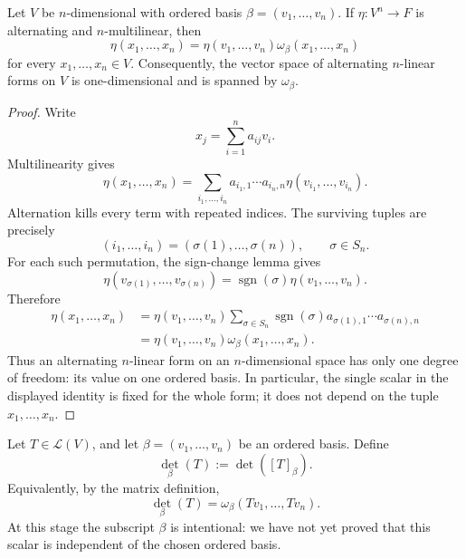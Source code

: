 \begin{lemma}\label{lem:top-alternating-forms}
Let \(V\) be \(n\)-dimensional with ordered basis
\(\beta=(v_1,\ldots,v_n)\).  If \(\eta:V^n\to F\) is alternating and
\(n\)-multilinear, then
\[
\eta(x_1,\ldots,x_n)
=\eta(v_1,\ldots,v_n)\omega_\beta(x_1,\ldots,x_n)
\]
for every \(x_1,\ldots,x_n\in V\).  Consequently, the vector space of
alternating \(n\)-linear forms on \(V\) is one-dimensional and is spanned by
\(\omega_\beta\).
\end{lemma}
\begin{proof}
Write
\[
x_j=\sum_{i=1}^n a_{ij}v_i.
\]
Multilinearity gives
\[
\eta(x_1,\ldots,x_n)
=\sum_{i_1,\ldots,i_n}
a_{i_1,1}\cdots a_{i_n,n}
\eta(v_{i_1},\ldots,v_{i_n}).
\]
Alternation kills every term with repeated indices.  The surviving tuples are
precisely
\[
(i_1,\ldots,i_n)=(\sigma(1),\ldots,\sigma(n)),
\qquad \sigma\in S_n.
\]
For each such permutation, the sign-change lemma gives
\[
\eta(v_{\sigma(1)},\ldots,v_{\sigma(n)})
=\operatorname{sgn}(\sigma)\eta(v_1,\ldots,v_n).
\]
Therefore
\[
\begin{aligned}
\eta(x_1,\ldots,x_n)
&=\eta(v_1,\ldots,v_n)
\sum_{\sigma\in S_n}\operatorname{sgn}(\sigma)
a_{\sigma(1),1}\cdots a_{\sigma(n),n}\\
&=\eta(v_1,\ldots,v_n)\omega_\beta(x_1,\ldots,x_n).
\end{aligned}
\]
Thus an alternating \(n\)-linear form on an \(n\)-dimensional space has only
one degree of freedom: its value on one ordered basis.  In particular, the
single scalar in the displayed identity is fixed for the whole form; it does
not depend on the tuple \(x_1,\ldots,x_n\).
\end{proof}

\begin{definition}
Let \(T\in\mathcal{L}(V)\), and let
\(\beta=(v_1,\ldots,v_n)\) be an ordered basis.  Define
\[
\det_\beta(T):=\det([T]_\beta).
\]
Equivalently, by the matrix definition,
\[
\det_\beta(T)=\omega_\beta(Tv_1,\ldots,Tv_n).
\]
At this stage the subscript \(\beta\) is intentional: we have not yet proved
that this scalar is independent of the chosen ordered basis.
\end{definition}

